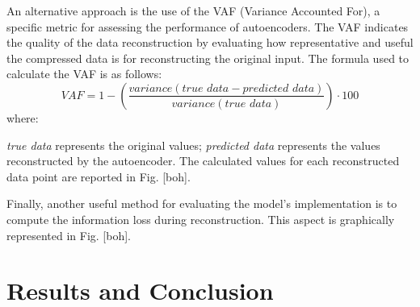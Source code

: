 \documentclass[9pt,technote]{IEEEtran}
\begin{document}
An alternative approach is the use of the VAF (Variance Accounted For), a specific metric for assessing the performance of autoencoders. The VAF indicates the quality of the data reconstruction by evaluating how representative and useful the compressed data is for reconstructing the original input. The formula used to calculate the VAF is as follows:
\begin{equation*}
	VAF = 1 - (\frac{variance(\textit{true data} - \textit{predicted data})}{variance(\textit{true data})}) \cdot 100
\end{equation*}
where:

\textit{true data} represents the original values;
\textit{predicted data} represents the values reconstructed by the autoencoder.
The calculated values for each reconstructed data point are reported in Fig. [boh].

Finally, another useful method for evaluating the model's implementation is to compute the information loss during reconstruction. This aspect is graphically represented in Fig. [boh].

\section{Results and Conclusion}
\end{document}
